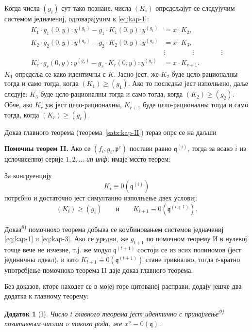 \documentclass[11pt]{article}
\theoremstyle{plain}
\newtheorem{zusatz}{Додаток}
\begin{document}
Когда числа $(g_{i})$ сут тако познане, числа $(K_{i})$ опрєдєљајут
се слєдујучим системом једначениј, одговарајучим к \eqref{eq:kap-1}:
\begin{equation}\label{eq:kap-3}
\begin{aligned}
K_{1}\cdot g_{1}(0,y):y^{(g_{1})} - g_{1}\cdot K_{1}(0,y):y^{(g_{1})} &= x\cdot K_{2},\\
K_{2}\cdot g_{2}(0,y):y^{(g_{2})} - g_{2}\cdot K_{2}(0,y):y^{(g_{2})} &= x\cdot K_{3},\\
&\vdots \qquad\qquad\vdots\qquad\qquad\vdots\\
K_{r}\cdot g_{r}(0,y):y^{(g_{r})} - g_{r}\cdot K_{r}(0,y):y^{(g_{r})} &= x\cdot K_{r+1}.
\end{aligned}
\end{equation}
$K_{1}$ опрєдєља се како идентичны с $K$. Јасно јест, же $K_{2}$
буде цєло-рационалны тогда и само тогда, когда
$(K_{1}) \geq (g_{1})$. Ако то послєдње јест изполњено, даље
слєдује: $K_{3}$ буде цєло-рационалны тогда и само тогда, когда
$(K_{2}) \geq (g_{2})$. Обче, ако $K_{r}$ уж јест цєло-рационалны,
$K_{r+1}$ буде цєло-рационалны тогда и само тогда, когда
$(K_{r}) \geq (g_{r})$.

Доказ главного теорема (теорема~\ref{satz:kap-II}) тераз опрє се на
даљши

\smallskip
\textbf{Помочны теорем II.} Ако се
$(f_{i}, g_{i}, \mathfrak{p}^{e})$ постави равно
$\mathfrak{q}^{(i)}$, тогда за всако $i$ из цєлочиселној серије
$1, 2, \ldots$ \textit{ин инф.} имаје мєсто теорем:

За конгруенцију
\[
K_{i} \equiv 0(\mathfrak{q}^{(i)})
\]
потрєбно и достаточно јест симултанно изполњење двех условиј:
\[
(K_{i}) \geq (g_{i}) \qquad \text{и} \qquad K_{i+1} \equiv 0(\mathfrak{q}^{(i+1)}).
\]

Доказ\textsuperscript{8)} помочнохо теорема добыва се комбиновањем
системов једначениј \eqref{eq:kap-1} и \eqref{eq:kap-3}. Ако се
урєдни, же $g_{t+1}$ по помочном теорему И в нулевој точце вече не
изчезне, т.ј. же модул $\mathfrak{q}^{(t+1)}$ состоји се из всих
полиномов (јест јединичны идеал), и зато
$K_{t+1} \equiv 0(\mathfrak{q}^{(t+1)})$ стане тривиално, тогда
$t$-кратно употрєбјење помочнохо теорема II даје доказ главного
теорема.

\smallskip
Без доказов, кторе находет се в мојеј горе цитованој расправи,
додају јешче два додатка к главному теорему:

\begin{zusatz}[I]
Число $t$ главного теорема јест идентично с принајмење\textsuperscript{9)}
позитивным числом $\nu$ такохо рода, же
$x^{\nu} \equiv 0(\mathfrak{q})$.
\end{zusatz}
\end{document}
